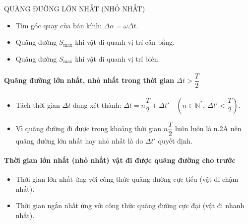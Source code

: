 \begin{dang}{QUÃNG ĐƯỜNG LỚN NHẤT (NHỎ NHẤT)}
\begin{center}
\begin{tikzpicture}[draw=Mapcolor,scale=1,thick,>=stealth']
\end{tikzpicture}
\end{center}
\begin{itemize}
\item Tìm góc quay của bán kính: $\Delta \alpha =\omega \Delta t$.
\item Quãng đường $S_{\max}$ khi vật đi quanh vị trí cân bằng.
\item  Quãng đường $S_{\max}$ khi vật đi quanh vị trí biên.
\end{itemize}
\paragraph{Quãng đường lớn nhất, nhỏ nhất trong thời gian $\Delta t>\dfrac{T}{2}$}
\begin{itemize}
\item Tách thời gian $\Delta t$ đang xét thành: $\Delta t=n\dfrac{T}{2}+\Delta t'\quad (n\in \mathbb{N^*},\ \Delta t'<\dfrac{T}{2})$.
\item Vì quãng đường đi được trong khoảng thời gian $n\dfrac{T}{2}$ luôn luôn là n.2A nên quãng đường lớn nhất hay nhỏ nhất là do $\Delta t'$ quyết định.
\end{itemize}
\paragraph{Thời gian lớn nhất (nhỏ nhất) vật đi được quãng đường cho trước}
\begin{itemize}
\item Thời gian lớn nhất ứng với công thức quãng đường cực tiểu (vật đi chậm nhất).
\item Thời gian ngắn nhất ứng với công thức quãng đường cực đại (vật đi nhanh nhất).
\end{itemize}
 \end{dang} 